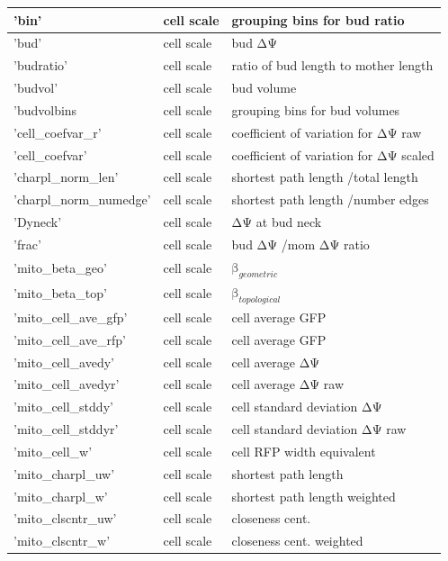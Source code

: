 \begin{longtable}{|l|l|l|}
	 'bin' & cell scale & grouping bins for bud ratio \\ \hline
	 'bud' & cell scale & bud ΔΨ \\ \hline
	 'budratio' & cell scale & ratio of bud length to mother length \\ \hline
	 'budvol' & cell scale & bud volume \\ \hline
	 'budvolbins & cell scale & grouping bins for bud volumes \\ \hline
	 'cell\_coefvar\_r' & cell scale & coefficient of variation for ΔΨ raw \\ \hline
	 'cell\_coefvar' & cell scale & coefficient of variation for ΔΨ scaled \\ \hline
	 'charpl\_norm\_len' & cell scale & shortest path length /total length \\ \hline
	 'charpl\_norm\_numedge' & cell scale & shortest path length /number edges \\ \hline
	 'Dyneck' & cell scale & ΔΨ at bud neck \\ \hline
	 'frac' & cell scale & bud ΔΨ /mom ΔΨ ratio \\ \hline
	 'mito\_beta\_geo' & cell scale & $\text{β}_{geometric}$ \\ \hline
	 'mito\_beta\_top' & cell scale & $\text{β}_{topological}$ \\ \hline
	 'mito\_cell\_ave\_gfp' & cell scale & cell average GFP \\ \hline
	 'mito\_cell\_ave\_rfp' & cell scale & cell average GFP \\ \hline
	 'mito\_cell\_avedy' & cell scale & cell average ΔΨ \\ \hline
	 'mito\_cell\_avedyr' & cell scale & cell average ΔΨ raw \\ \hline
	 'mito\_cell\_stddy' & cell scale & cell standard deviation ΔΨ \\ \hline 
	 'mito\_cell\_stddyr' & cell scale & cell standard deviation ΔΨ raw \\ \hline
	 'mito\_cell\_w' & cell scale & cell RFP width equivalent \\ \hline
	 'mito\_charpl\_uw' & cell scale & shortest path length \\ \hline
	 'mito\_charpl\_w' & cell scale & shortest path length weighted \\ \hline
	 'mito\_clscntr\_uw' & cell scale & closeness cent. \\ \hline
	 'mito\_clscntr\_w' & cell scale & closeness cent. weighted \\ \hline

\end{longtable}
